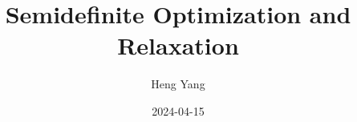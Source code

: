 \documentclass[
]{book}
\title{Semidefinite Optimization and Relaxation}
\author{Heng Yang}
\date{2024-04-15}
\theoremstyle{definition}
\theoremstyle{definition}
\theoremstyle{definition}
\theoremstyle{definition}
\theoremstyle{remark}
\begin{document}
\maketitle

{
\setcounter{tocdepth}{1}
\tableofcontents
}
\newcommand{\calG}{\mathcal{G}}
\newcommand{\calC}{\mathcal{C}}
\newcommand{\calV}{\mathcal{V}}
\newcommand{\calE}{\mathcal{E}}
\newcommand{\calF}{\mathcal{F}}
\newcommand{\calP}{\mathcal{P}}
\newcommand{\calQ}{\mathcal{Q}}
\newcommand{\calA}{\mathcal{A}}
\newcommand{\calL}{\mathcal{L}}
\newcommand{\calB}{\mathcal{B}}
\newcommand{\calK}{\mathcal{K}}
\newcommand{\calS}{\mathcal{S}}
\newcommand{\calM}{\mathcal{M}}
\newcommand{\calI}{\mathcal{I}}
\newcommand{\calR}{\mathcal{R}}
\newcommand{\calZ}{\mathcal{Z}}
\newcommand{\mathx}{\mathrm{x}}
\newcommand{\mathy}{\mathrm{y}}
\newcommand{\bbE}{\mathbb{E}}
\newcommand{\calN}{\mathcal{N}}
\newcommand{\tldR}{\tilde{R}}
\newcommand{\bbZ}{\mathbb{Z}}
\newcommand{\bbQ}{\mathbb{Q}}
\newcommand{\bbC}{\mathbb{C}}
\newcommand{\bbF}{\mathbb{F}}
\newcommand{\bbR}{\mathbb{R}}

\newcommand{\Real}[1]{\mathbb{R}^{#1}}
\newcommand{\Comp}[1]{\mathbb{C}^{#1}}
\newcommand{\sym}[1]{\mathbb{S}^{#1}}
\newcommand{\psd}[1]{\sym{#1}_{+}}
\newcommand{\pd}[1]{\sym{#1}_{++}}
\newcommand{\inprod}[2]{\langle #1, #2 \rangle}
\newcommand{\linprod}[2]{\left\langle #1, #2 \right\rangle}
\newcommand{\trace}{\mathrm{tr}}
\newcommand{\tran}{^\top}

\newcommand{\rank}{\mathrm{rank}}
\newcommand{\diag}{\mathrm{diag}}
\newcommand{\Diag}{\mathrm{Diag}}
\newcommand{\BlkDiag}{\mathrm{BlkDiag}}
\newcommand{\vectorize}{\mathrm{vec}}
\newcommand{\svec}{\mathrm{svec}}
\newcommand{\mat}{\mathrm{mat}}
\newcommand{\smat}{\mathrm{smat}}
\newcommand{\norm}[1]{\Vert #1 \Vert}
\newcommand{\lnorm}[1]{\left\Vert #1 \right\Vert}
\newcommand{\pnorm}[2]{\Vert #1 \Vert_{#2}}
\newcommand{\Fnorm}[1]{\Vert #1 \Vert_\mathrm{F}}
\newcommand{\conv}{\mathrm{conv}}
\newcommand{\cone}{\mathrm{cone}}
\newcommand{\interior}{\mathrm{int}}
\newcommand{\relint}{\mathrm{ri}}
\newcommand{\poly}[1]{\mathbb{R}[#1]}
\newcommand{\SOd}{\mathrm{SO}(d)}
\newcommand{\SOthree}{\mathrm{SO}(3)}
\newcommand{\Od}{\mathrm{O}(d)}
\newcommand{\Ogroup}{\mathrm{O}}
\newcommand{\usphere}{\mathcal{S}}
\newcommand{\bmath}[1]{\boldsymbol{#1}}
\newcommand{\lbrkt}{[\![}
\newcommand{\rbrkt}{]\!]}
\newcommand{\brkt}[1]{\lbrkt #1 \rbrkt}
\newcommand{\bracket}[1]{[ #1 ]}
\newcommand{\sign}{\mathrm{sgn}}
\end{document}
